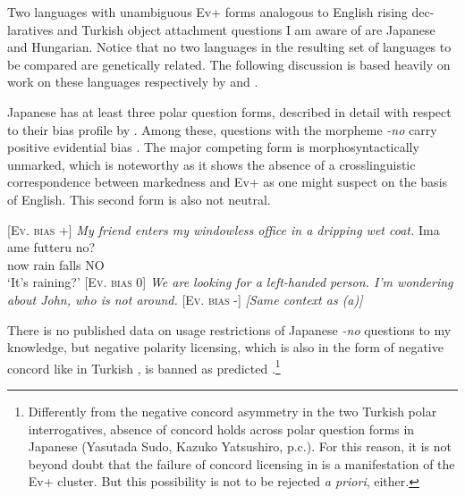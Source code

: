 \documentclass[output=paper,colorlinks,citecolor=brown]{langscibook}
\begin{document}
Two languages with unambiguous Ev+ forms analogous to English rising dec-laratives and Turkish object attachment questions I am aware of are Japanese and Hungarian. Notice that no two languages in the resulting set of languages to be compared are genetically related. The following discussion is based heavily on work on these languages respectively by \citet{sudo-bias} and \citet{gyuris-bias}. 

Japanese has at least three polar question forms, described in detail with respect to their bias profile by \citet{sudo-bias}. Among these, questions with the morpheme \textit{-no} carry positive evidential bias . The major competing form is morphosyntactically unmarked, which is noteworthy as it shows the absence of a crosslinguistic correspondence between markedness and Ev+ as one might suspect on the basis of English. This second form is also not neutral.   


\ea\label{japaneserain}
\ea \textsc{[Ev. bias +]} \textit{My friend enters my windowless office in a dripping wet coat.}
\sn 
\gll Ima ame futteru no?\\
now rain falls NO\\
\glt `It's raining?'
\ex \textsc{[Ev. bias 0]} \textit{We are looking for a left-handed person. I'm wondering about John, who is not around.}
\ex \textsc{[Ev. bias -]}  \textit{[Same context as (a)]}
\z
\z

There is no published data on usage restrictions of Japanese \textit{-no} questions to my knowledge, but negative polarity licensing, which is also in the form of negative concord like in Turkish \citep{Watanabe:2004}, is banned as predicted .\footnote{Differently from the negative concord asymmetry in the two Turkish polar interrogatives, absence of concord holds across polar question forms in Japanese (Yasutada Sudo, Kazuko Yatsushiro, p.c.). For this reason, it is not beyond doubt that the failure of concord licensing in  is a manifestation of the Ev+ cluster.  But this possibility is not to be rejected \textit{a priori}, either.} 

\label{japanese-nc}
\z
\end{document}
